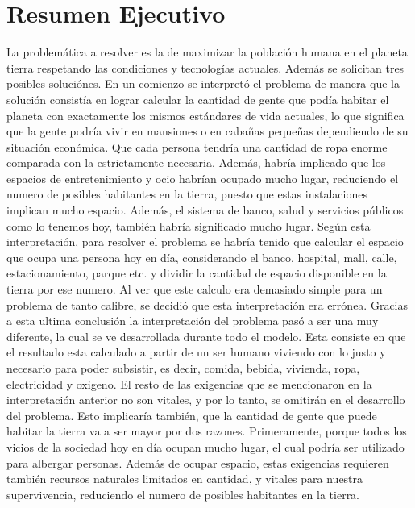 \documentclass[12pt]{report}
\begin{document}
\section*{Resumen Ejecutivo}
La problem\'atica a resolver es la de maximizar la poblaci\'on humana en el planeta tierra respetando las condiciones y tecnolog\'ias actuales. Adem\'as se solicitan tres posibles soluci\'ones.
En un comienzo se interpret\'o el problema de manera que la soluci\'on consist\'ia en lograr calcular la cantidad de gente que pod\'ia habitar el planeta con exactamente los mismos est\'andares de vida actuales, lo que significa que la gente podr\'ia vivir en mansiones o en caba\~nas peque\~nas dependiendo de su situaci\'on econ\'omica. Que cada persona tendr\'ia una cantidad de ropa enorme comparada con la estrictamente necesaria. Adem\'as, habr\'ia implicado que los espacios de entretenimiento y ocio habr\'ian ocupado mucho lugar, reduciendo el numero de posibles habitantes en la tierra, puesto que estas instalaciones implican mucho espacio. Adem\'as, el sistema de banco, salud y servicios p\'ublicos como lo tenemos hoy, tambi\'en habr\'ia significado mucho lugar. 
Seg\'un esta interpretaci\'on, para resolver el problema se habr\'ia tenido que calcular el espacio que ocupa una persona hoy en d\'ia, considerando el banco, hospital, mall, calle, estacionamiento, parque etc. y dividir la cantidad de espacio disponible en la tierra por ese numero. Al ver que este calculo era demasiado simple para un problema de tanto calibre, se decidi\'o que esta interpretaci\'on era err\'onea. 
  Gracias a esta ultima conclusi\'on la interpretaci\'on del problema pas\'o a ser una muy diferente, la cual se ve desarrollada durante todo el modelo. Esta consiste en que el resultado  esta calculado a partir de un ser humano viviendo con lo justo y necesario para poder subsistir, es decir, comida, bebida, vivienda, ropa, electricidad y oxigeno. El resto de las exigencias que se mencionaron en la interpretaci\'on anterior no son vitales, y por lo tanto, se omitir\'an en el desarrollo del problema. Esto implicar\'ia tambi\'en, que la cantidad de gente que puede habitar la tierra va a ser mayor por dos razones. Primeramente, porque todos los vicios de la sociedad hoy en d\'ia ocupan mucho lugar, el cual podr\'ia ser utilizado para albergar personas. Adem\'as de ocupar espacio, estas exigencias requieren tambi\'en recursos naturales limitados en cantidad, y vitales para nuestra supervivencia, reduciendo el numero de posibles habitantes en la tierra.  
  
\end{document}
